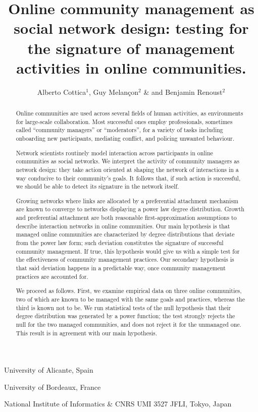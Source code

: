 \documentclass{nature}
\title{Online community management as social network design: testing for the signature of management activities in online communities.}
\author{Alberto Cottica$^1$, Guy Melan\c {c}on$^2$ \& and Benjamin Renoust$^2$}
\begin{document}
\maketitle

\begin{affiliations}
 \item University of Alicante, Spain
 \item University of Bordeaux, France
 \item National Institute of Informatics \& CNRS UMI 3527 JFLI, Tokyo, Japan
\end{affiliations}

\begin{abstract}
Online communities are used across several fields of human activities, as environments for large-scale collaboration. Most successful ones employ professionals, sometimes called “community managers” or “moderators”, for a variety of tasks including onboarding new participants, mediating conflict, and policing unwanted behaviour. 

Network scientists routinely model interaction across participants in online communities as social networks. We interpret the activity of community managers as network design: they take action oriented at shaping the network of interactions in a way conducive to their community's goals. It follows that, if such action is successful, we should be able to detect its signature in the network itself. 

Growing networks where links are allocated by a preferential attachment mechanism are known to converge to networks displaying a power law degree distribution. Growth and preferential attachment are both reasonable first-approximation assumptions to describe interaction networks in online communities. Our main hypothesis is that managed online communities are characterized by degree distributions that deviate from the power law form; such deviation constitutes the signature of successful community management. If true, this hypothesis would give us with a simple test for the effectiveness of community management practices. Our secondary hypothesis is that said deviation happens in a predictable way, once community management practices are accounted for.

We proceed as follows. First, we examine empirical data on three online communities, two of which are known to be managed with the same goals and practices, whereas the third is known not to be. We run statistical tests of the null hypothesis that their degree distribution was generated by a power function; the test strongly rejects the null for the two managed communities, and does not reject it for the unmanaged one. This result is in agreement with our main hypothesis.


\end{abstract}
\end{document}
